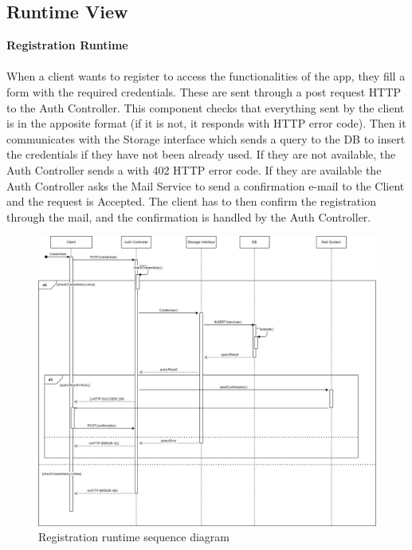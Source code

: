 \documentclass[a4paper, 12pt, oneside, table]{article}
\begin{document}
\subsection{Runtime View}

\textbf{Registration Runtime}\\
\\
When a client wants to register to access the functionalities of the app, they fill a form with the required credentials. These are sent through a post request HTTP to the Auth Controller. This component checks that everything sent by the client is in the apposite format (if it is not, it responds with HTTP error code). Then it communicates with the Storage interface which sends a query to the DB to insert the credentials if they have not been already used. If they are not available, the Auth Controller sends a with 402 HTTP error code. If they are available the Auth Controller asks the Mail Service to send a confirmation e-mail to the Client and the request is Accepted. The client has to then confirm the registration through the mail, and the confirmation is handled by the Auth Controller.
\begin{figure}[H]
\centering
    \centering
    \includegraphics[height=0.5\textheight, scale=0.5, keepaspectratio]{img/seq_diag/Register_Runtime.jpg}
    \caption{Registration runtime sequence diagram}
    \label{regRunTime}
\end{figure}
\end{document}
